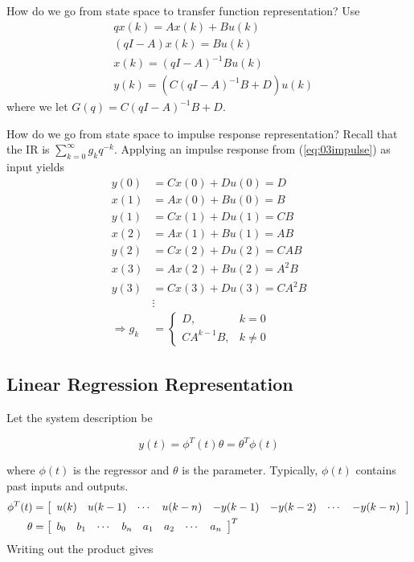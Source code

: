 How do we go from state space to transfer function representation? Use
\begin{align*}
&qx(k) = Ax(k) + Bu(k) \\
&(qI-A)x(k) = Bu(k) \\
&x(k) = {(qI-A)}^{-1}Bu(k) \\
&y(k) = ({C(qI-A)}^{-1}B+D)u(k)
\end{align*}
where we let $G(q) = C{(qI-A)}^{-1}B+D$.

How do we go from state space to impulse response representation? Recall that the IR is $\sum_{k=0}^\infty g_k q^{-k}$.
Applying an impulse response from (\ref{eq:03impulse}) as input yields
\begin{align*}
y(0) &= Cx(0) + Du(0) = D \\
x(1) &= Ax(0) + Bu(0) = B \\
y(1) &= Cx(1) + Du(1) = CB \\
x(2) &= Ax(1) + Bu(1) = AB \\
y(2) &= Cx(2) + Du(2) = CAB \\
x(3) &= Ax(2) + Bu(2) = A^2B \\
y(3) &= Cx(3) + Du(3) = CA^2B \\
&\vdots \\
\Rightarrow g_k &= \begin{cases} D, & k=0 \\ CA^{k-1}B, & k\neq 0 \end{cases}
\end{align*}

\subsection{Linear Regression Representation}%
\label{sec:linearregression}
Let the system description be

\begin{equation*}
y(t)=\phi^T(t)\theta = \theta^T\phi(t)
\end{equation*}

where $\phi(t)$ is the regressor and $\theta$ is the parameter.
Typically, $\phi(t)$ contains past inputs and outputs.
\begin{align*}
\phi^T(t) &= \left[\begin{array}{c c c c c c c c}
u(k) & u(k-1) & \cdots & u(k-n) & -y(k-1) & -y(k-2) & \cdots & -y(k-n) \end{array}\right] \\
\theta{} &= \left[\begin{array}{c c c c c c c c}
b_0 & b_1 & \cdots & b_n & a_1 & a_2 & \cdots & a_n \end{array}\right]^T
\end{align*}
Writing out the product gives

